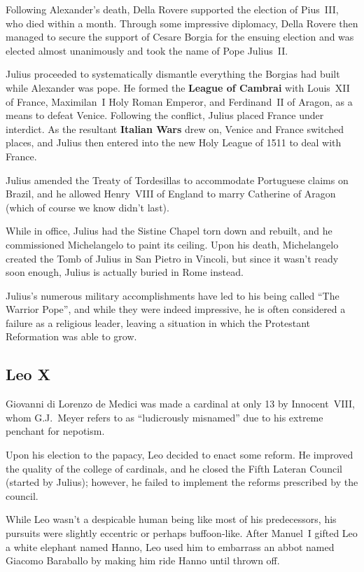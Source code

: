 Following Alexander's death,
Della Rovere supported the election of Pius~III, who died within a month.
Through some impressive diplomacy,
Della Rovere then managed to secure the support of Cesare Borgia for the ensuing election
and was elected almost unanimously and took the name of Pope Julius~II\@.

Julius proceeded to systematically dismantle everything
the Borgias had built while Alexander was pope.
He formed the \textbf{League of Cambrai}
with Louis~XII of France, Maximilan~I Holy Roman Emperor, and Ferdinand~II of Aragon,
as a means to defeat Venice.
Following the conflict, Julius placed France under interdict.
As the resultant \textbf{Italian Wars} drew on, Venice and France switched places,
and Julius then entered into the new Holy League of 1511 to deal with France.

Julius amended the Treaty of Tordesillas to accommodate Portuguese claims on Brazil,
and he allowed Henry~VIII of England to marry Catherine of Aragon
(which of course we know didn't last).

While in office, Julius had the Sistine Chapel torn down and rebuilt,
and he commissioned Michelangelo to paint its ceiling.
Upon his death, Michelangelo created the Tomb of Julius in San Pietro in Vincoli,
but since it wasn't ready soon enough, Julius is actually buried in Rome instead.

Julius's numerous military accomplishments have led to his being called ``The Warrior Pope'',
and while they were indeed impressive, he is often considered a failure as a religious leader,
leaving a situation in which the Protestant Reformation was able to grow.

\subsection*{Leo X}

Giovanni di Lorenzo de Medici was made a cardinal at only 13 by Innocent~VIII,
whom G.J.\ Meyer refers to as ``ludicrously misnamed'' due to his extreme penchant for nepotism.

Upon his election to the papacy, Leo decided to enact some reform.
He improved the quality of the college of cardinals,
and he closed the Fifth Lateran Council (started by Julius);
however, he failed to implement the reforms prescribed by the council.

While Leo wasn't a despicable human being like most of his predecessors,
his pursuits were slightly eccentric or perhaps buffoon-like.
After Manuel~I gifted Leo a white elephant named Hanno,
Leo used him to embarrass an abbot named Giacomo Baraballo by making him ride Hanno until thrown off.

